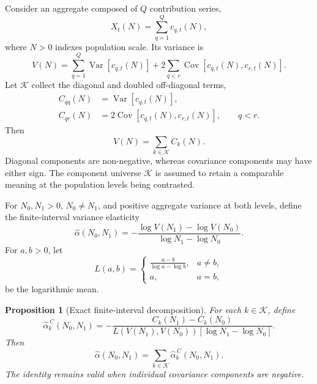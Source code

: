 \documentclass[a4paper,fleqn]{cas-dc}
\newtheorem{proposition}{Proposition}
\begin{document}
Consider an aggregate composed of $Q$ contribution series,
\begin{equation}
    X_t(N)=\sum_{q=1}^{Q}c_{q,t}(N),
\end{equation}
where $N>0$ indexes population scale. Its variance is
\begin{equation}
\label{eq:variance_accounting}
    V(N)
    =
    \sum_{q=1}^{Q}\operatorname{Var}\!\left[c_{q,t}(N)\right]
    +
    2\sum_{q<r}\operatorname{Cov}\!\left[c_{q,t}(N),c_{r,t}(N)\right].
\end{equation}
Let $\mathcal{K}$ collect the diagonal and doubled
off-diagonal terms,
\begin{align}
    C_{qq}(N)
    &=
    \operatorname{Var}\!\left[c_{q,t}(N)\right], \\
    C_{qr}(N)
    &=
    2\operatorname{Cov}\!\left[c_{q,t}(N),c_{r,t}(N)\right],
    \qquad q<r.
\end{align}
Then
\begin{equation}
\label{eq:component_sum}
    V(N)=\sum_{k\in\mathcal{K}}C_k(N).
\end{equation}
Diagonal components are non-negative, whereas covariance components may
have either sign. The component universe $\mathcal{K}$ is assumed to
retain a comparable meaning at the population levels being contrasted.

For $N_0,N_1>0$, $N_0\neq N_1$, and positive aggregate variance at both
levels, define the finite-interval variance elasticity
\begin{equation}
\label{eq:direct_alpha}
    \widehat{\alpha}(N_0,N_1)
    =
    -\frac{
        \log V(N_1)-\log V(N_0)
    }{
        \log N_1-\log N_0
    }.
\end{equation}
For $a,b>0$, let
\begin{equation}
\label{eq:log_mean}
    L(a,b)
    =
    \begin{cases}
        \displaystyle\frac{a-b}{\log a-\log b}, & a\neq b,\\[1em]
        a, & a=b,
    \end{cases}
\end{equation}
be the logarithmic mean.

\begin{proposition}[Exact finite-interval decomposition]
\label{prop:exact_decomposition}
For each $k\in\mathcal{K}$, define
\begin{equation}
\label{eq:component_alpha_contribution}
    \widehat{\alpha}^{\,C}_k(N_0,N_1)
    =
    -\frac{
        C_k(N_1)-C_k(N_0)
    }{
        L\!\left(V(N_1),V(N_0)\right)
        \left[\log N_1-\log N_0\right]
    }.
\end{equation}
Then
\begin{equation}
\label{eq:exact_alpha_decomposition}
    \widehat{\alpha}(N_0,N_1)
    =
    \sum_{k\in\mathcal{K}}
    \widehat{\alpha}^{\,C}_k(N_0,N_1).
\end{equation}
The identity remains valid when individual covariance components are
negative.
\end{proposition}
\end{document}
